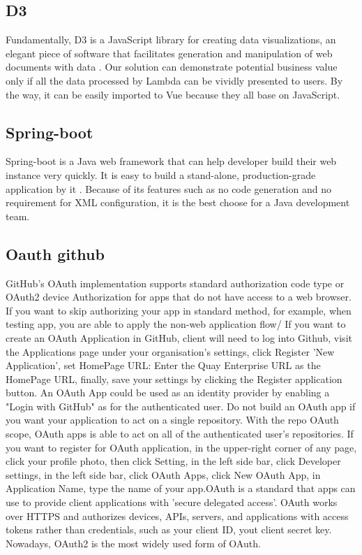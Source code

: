 \documentclass[conference]{IEEEtran}
\begin{document}
\subsection{D3}

Fundamentally, D3 is a JavaScript library for creating data visualizations, an elegant piece of software that facilitates 
generation and manipulation of web documents with data \cite{2013Interactive}. Our solution can demonstrate potential business 
value only if all the data processed by Lambda can be vividly presented to users. By the way, it can be easily imported to 
Vue because they all base on JavaScript.
 
\subsection{Spring-boot}

Spring-boot is a Java web framework that can help developer build their web instance very quickly. It is easy to build a 
stand-alone, production-grade application by it \cite{SpringBo66:online}. Because of its features such as no code generation 
and no requirement for XML configuration, it is the best choose for a Java development team.

\subsection{Oauth github}

GitHub's OAuth implementation supports standard authorization code type or OAuth2 device Authorization
for apps that do not have access to a web browser. If you want to skip authorizing your app in
standard method, for example, when testing app, you are able to apply the non-web application flow/
If you want to create an OAuth Application in GitHub, client will need to log into Github, visit
the Applications page under your organisation's settings, click Register 'New Application',
set HomePage URL: Enter the Quay Enterprise URL as the HomePage URL, finally, save your settings by
clicking the Register application button. An OAuth App could be used as an identity provider by enabling
a "Login with GitHub" as for the authenticated user. Do not build an OAuth app if you want your
application to act on a single repository. With the repo OAuth scope, OAuth apps is able to act on
all of the authenticated user's repositories. If you want to register for OAuth application,
in the upper-right corner of any page, click your profile photo, then click Setting, in the
left side bar, click Developer settings, in the left side bar, click OAuth Apps, click New
OAuth App, in Application Name, type the name of your app.OAuth is a standard that apps can
use to provide client applications with 'secure delegated access'. OAuth works over HTTPS and
authorizes devices, APIs, servers, and applications with access tokens rather than credentials,
such as your client ID, yout client secret key. Nowadays, OAuth2 is the most widely used form of
OAuth.
\end{document}
